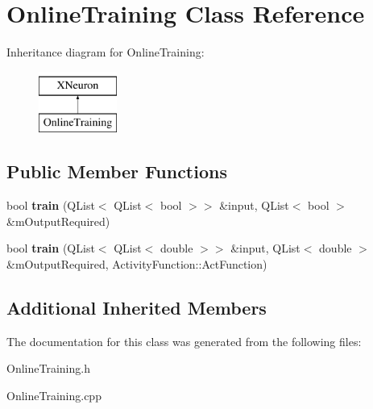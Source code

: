 \hypertarget{class_online_training}{}\section{Online\+Training Class Reference}
\label{class_online_training}
Inheritance diagram for Online\+Training\+:\begin{figure}[H]
\begin{center}
\leavevmode
\includegraphics[height=2.000000cm]{class_online_training}
\end{center}
\end{figure}
\subsection*{Public Member Functions}
\begin{DoxyCompactItemize}
\item 
\hypertarget{class_online_training_a70f7c77023c742884f80bed13af05db4}{}\label{class_online_training_a70f7c77023c742884f80bed13af05db4} 
bool {\bfseries train} (Q\+List$<$ Q\+List$<$ bool $>$$>$ \&input, Q\+List$<$ bool $>$ \&m\+Output\+Required)
\item 
\hypertarget{class_online_training_aca19870825ac3f0c35ebdc7583f5571e}{}\label{class_online_training_aca19870825ac3f0c35ebdc7583f5571e} 
bool {\bfseries train} (Q\+List$<$ Q\+List$<$ double $>$$>$ \&input, Q\+List$<$ double $>$ \&m\+Output\+Required, Activity\+Function\+::\+Act\+Function)
\end{DoxyCompactItemize}
\subsection*{Additional Inherited Members}


The documentation for this class was generated from the following files\+:\begin{DoxyCompactItemize}
\item 
Online\+Training.\+h\item 
Online\+Training.\+cpp\end{DoxyCompactItemize}
